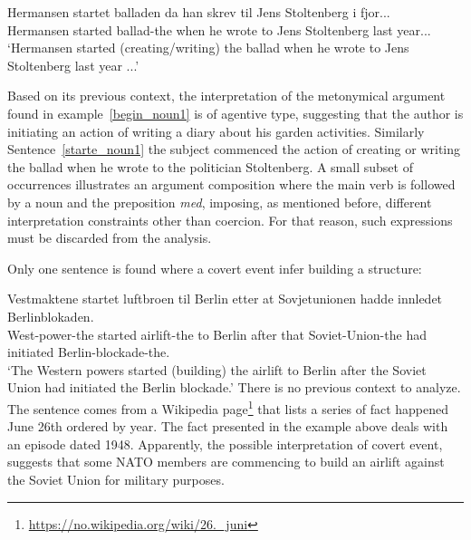 \documentclass{article}
\begin{document}
        \ea \label{starte_noun1} %

        \gll Hermansen startet balladen da han skrev til Jens Stoltenberg i fjor...\\
             Hermansen started ballad-the when he wrote to Jens Stoltenberg last year...\\
        \glt ‘Hermansen started (creating/writing) the ballad when he wrote to Jens Stoltenberg last year ...’
        \z
    
    
 \noindent Based on its previous context, the interpretation of the metonymical argument found in example~\ref{begin_noun1} is of agentive type, suggesting that the author is initiating an action of writing a diary about his garden activities. Similarly Sentence~\ref{starte_noun1}
 the subject commenced the action of creating or writing the ballad when he wrote to the politician Stoltenberg. 
 A small subset of occurrences illustrates an argument composition where the main verb is followed by a noun and the preposition \emph{med}, imposing, as mentioned before, different interpretation constraints other than coercion. For that reason, such expressions must be discarded from the analysis.

Only one sentence is found where a covert event infer building a structure:
        \ea \label{begin_noun2} %

        \gll Vestmaktene startet luftbroen til Berlin etter at Sovjetunionen hadde innledet Berlinblokaden.\\
             West-power-the started airlift-the to Berlin after that Soviet-Union-the had initiated Berlin-blockade-the.\\
        \glt ‘The Western powers started (building) the airlift to Berlin after the Soviet Union had initiated the Berlin blockade.’
        \z
There is no previous context to analyze. The sentence comes from a Wikipedia page\footnote{\url{https://no.wikipedia.org/wiki/26._juni}} that lists a series of fact happened June 26th ordered by year. The fact presented in the example above deals with an episode dated 1948. Apparently, the possible interpretation of covert event, suggests that some NATO members are commencing to build an airlift against the Soviet Union for military purposes.  
\end{document}
